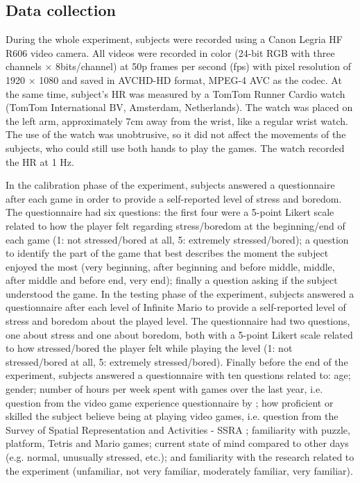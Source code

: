 \subsection{Data collection}

During the whole experiment, subjects were recorded using a Canon Legria HF R606 video camera. All videos were recorded in color (24-bit RGB with three channels $\times$ 8bits/channel) at 50p frames per second (fps) with pixel resolution of 1920 $\times$ 1080 and saved in AVCHD-HD format, MPEG-4 AVC as the codec. At the same time, subject's HR was measured by a TomTom Runner Cardio watch (TomTom International BV, Amsterdam, Netherlands). The watch was placed on the left arm, approximately 7cm away from the wrist, like a regular wrist watch. The use of the watch was unobtrusive, so it did not affect the movements of the subjects, who could still use both hands to play the games. The watch recorded the HR at 1 Hz.

In the calibration phase of the experiment, subjects answered a questionnaire after each game in order to provide a self-reported level of stress and boredom. The questionnaire had six questions: the first four were a 5-point Likert scale related to how the player felt regarding stress/boredom at the beginning/end of each game (1: not stressed/bored at all, 5: extremely stressed/bored); a question to identify the part of the game that best describes the moment the subject enjoyed the most (very beginning, after beginning and before middle, middle, after middle and before end, very end); finally a question asking if the subject understood the game. In the testing phase of the experiment, subjects answered a questionnaire after each level of Infinite Mario to provide a self-reported level of stress and boredom about the played level. The questionnaire had two questions, one about stress and one about boredom, both with a 5-point Likert scale related to how stressed/bored the player felt while playing the level (1: not stressed/bored at all, 5: extremely stressed/bored). Finally before the end of the experiment, subjects answered a questionnaire with ten questions related to: age; gender; number of hours per week spent with games over the last year, i.e. question from the video game experience questionnaire by \parencite{unsworth2015playing}; how proficient or skilled the subject believe being at playing video games, i.e. question from the Survey of Spatial Representation and Activities - SSRA \parencite{terlecki2005important}; familiarity with puzzle, platform, Tetris and Mario games; current state of mind compared to other days (e.g. normal, unusually stressed, etc.); and familiarity with the research related to the experiment (unfamiliar, not very familiar, moderately familiar, very familiar).

